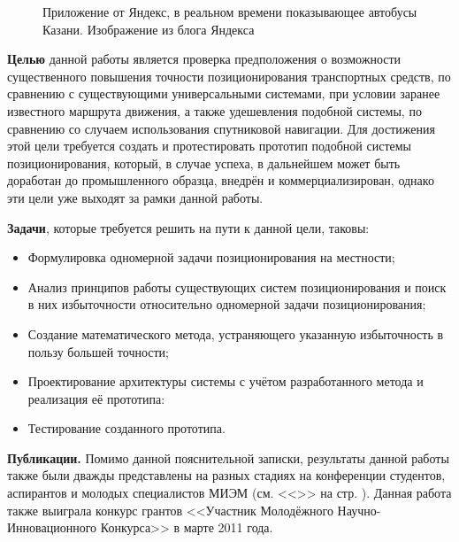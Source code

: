 \begin{figure}[h]
	\caption{Приложение от Яндекс, в реальном времени показывающее автобусы Казани. Изображение из блога Яндекса\cite{yakazan}}
	\label{fig:yakazan}
\end{figure}

{\bf Целью} данной работы является проверка предположения о возможности существенного повышения точности позиционирования транспортных средств, по сравнению с существующими универсальными системами, при условии заранее известного маршрута движения, а также удешевления подобной системы, по сравнению со случаем использования спутниковой навигации. Для достижения этой цели требуется создать и протестировать прототип подобной системы позиционирования, который, в случае успеха, в дальнейшем может быть доработан до промышленного образца, внедрён и коммерциализирован, однако эти цели уже выходят за рамки данной работы.

{\bf Задачи}, которые требуется решить на пути к данной цели, таковы:

\begin{itemize}
	\item
		Формулировка одномерной задачи позиционирования на местности;
	\item
		Анализ принципов работы существующих систем позиционирования и поиск в них избыточности относительно одномерной задачи позиционирования;
	\item
		Создание математического метода, устраняющего указанную избыточность в пользу большей точности;
	\item
		Проектирование архитектуры системы с учётом разработанного метода и реализация её прототипа:
	\item
		Тестирование созданного прототипа.
\end{itemize}

{\bf Публикации.} Помимо данной пояснительной записки, результаты данной работы также были дважды представлены на разных стадиях на конференции студентов, аспирантов и молодых специалистов МИЭМ (см. <<>> на стр. \pageref{chap:publications}). Данная работа также выиграла конкурс грантов <<Участник Молодёжного Научно-Инновационного Конкурса>> в марте 2011 года\cite{umnikwinners}.
